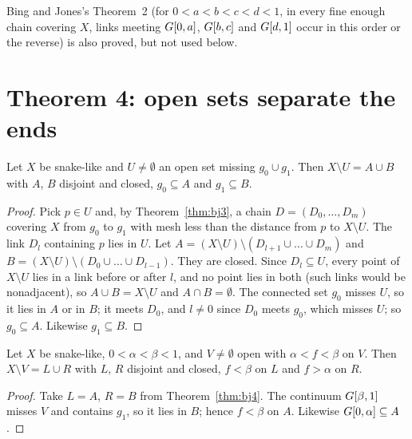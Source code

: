 Bing and Jones's Theorem~2 (for $0<a<b<c<d<1$, in every fine enough chain covering $X$, links meeting $G[0,a]$, $G[b,c]$ and $G[d,1]$ occur in this order or the
reverse) is also proved, but not used below.


\section{Theorem 4: open sets separate the ends}

\begin{theorem}\label{thm:bj4}
Let $X$ be snake-like and $U\neq\emptyset$ an open set missing $g_0\cup g_1$. Then $X\setminus U=A\cup B$ with $A$, $B$ disjoint and closed, $g_0\subseteq A$
and $g_1\subseteq B$.
\end{theorem}

\begin{proof}
Pick $p\in U$ and, by Theorem~\ref{thm:bj3}, a chain $D=(D_0,\dots,D_m)$ covering $X$ from $g_0$ to $g_1$ with mesh less than the distance from $p$ to $X\setminus U$.
The link $D_l$ containing $p$ lies in $U$. Let $A=(X\setminus U)\setminus(D_{l+1}\cup\dots\cup D_m)$ and $B=(X\setminus U)\setminus(D_0\cup\dots\cup D_{l-1})$. They
are closed. Since $D_l\subseteq U$, every point of $X\setminus U$ lies in a link before or after $l$, and no point lies in both (such links would be
nonadjacent), so $A\cup B=X\setminus U$ and $A\cap B=\emptyset$. The connected set $g_0$ misses $U$, so it lies in $A$ or in $B$; it meets $D_0$, and $l\ne0$
since $D_0$ meets $g_0$, which misses $U$; so $g_0\subseteq A$. Likewise $g_1\subseteq B$.
\end{proof}


\begin{corollary}\label{cor:bj-cut}
Let $X$ be snake-like, $0<\alpha<\beta<1$, and $V\neq\emptyset$ open with $\alpha<f<\beta$ on $V$. Then $X\setminus V=L\cup R$ with $L$, $R$ disjoint and
closed, $f<\beta$ on $L$ and $f>\alpha$ on $R$.
\end{corollary}

\begin{proof}
Take $L=A$, $R=B$ from Theorem~\ref{thm:bj4}. The continuum $G[\beta,1]$ misses $V$ and contains $g_1$, so it lies in $B$; hence $f<\beta$ on $A$. Likewise
$G[0,\alpha]\subseteq A$.
\end{proof}

